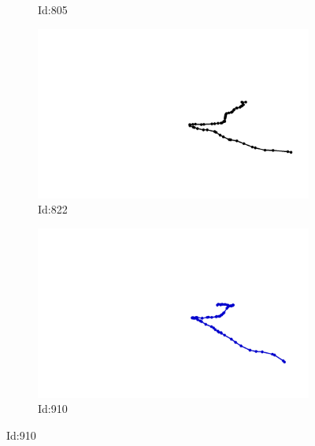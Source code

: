 \documentclass[12pt,twoside]{report}
\begin{document}
\begin{figure}
\begin{subfigure}[b]{0.20\textwidth}
\caption{Id:805}
\end{subfigure}
\begin{subfigure}[b]{0.20\textwidth}
\centering
\includegraphics[width=\textwidth]{../../trajectories/822.png}
\caption{Id:822}
\end{subfigure}
\begin{subfigure}[b]{0.20\textwidth}
\centering
\includegraphics[width=\textwidth]{../../trajectories/910.png}
\caption{Id:910}
\end{subfigure}
\end{figure}
\end{document}

